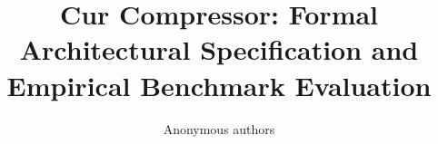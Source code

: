 \title{\textbf{Cur Compressor: Formal Architectural Specification and Empirical Benchmark Evaluation}}

\author{Anonymous authors}
